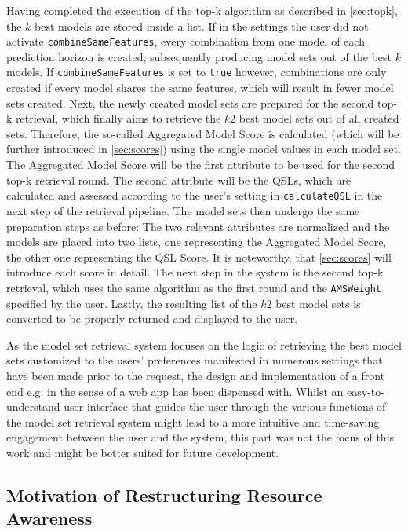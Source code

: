 Having completed the execution of the top-k algorithm as described in \autoref{sec:topk}, the $k$ best models are stored inside a list. If in the settings the user did not activate \texttt{combineSameFeatures}, every combination from one model of each prediction horizon is created, subsequently producing model sets out of the best $k$ models. If \texttt{combineSameFeatures} is set to \texttt{true} however, combinations are only created if every model shares the same features, which will result in fewer model sets created. Next, the newly created model sets are prepared for the second top-k retrieval, which finally aims to retrieve the $k2$ best model sets out of all created sets. Therefore, the so-called Aggregated Model Score is calculated (which will be further introduced in \autoref{sec:scores}) using the single model values in each model set. The Aggregated Model Score will be the first attribute to be used for the second top-k retrieval round. The second attribute will be the QSLs, which are calculated and assessed according to the user's setting in \texttt{calculateQSL} in the next step of the retrieval pipeline. The model sets then undergo the same preparation steps as before: The two relevant attributes are normalized and the models are placed into two lists, one representing the Aggregated Model Score, the other one representing the QSL Score. It is noteworthy, that \autoref{sec:scores} will introduce each score in detail. The next step in the system is the second top-k retrieval, which uses the same algorithm as the first round and the \texttt{AMSWeight} specified by the user. Lastly, the resulting list of the $k2$ best model sets is converted to be properly returned and displayed to the user.

As the model set retrieval system focuses on the logic of retrieving the best model sets customized to the users' preferences manifested in numerous settings that have been made prior to the request, the design and implementation of a front end e.g. in the sense of a web app has been dispensed with. Whilst an easy-to-understand user interface that guides the user through the various functions of the model set retrieval system might lead to a more intuitive and time-saving engagement between the user and the system, this part was not the focus of this work and might be better suited for future development.



\subsection{Motivation of Restructuring Resource Awareness}\label{sec:motivationRA}


